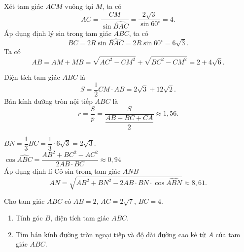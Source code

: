 \begin{bt}
{\begin{center}
\begin{tikzpicture}[line join = round, line cap = round,>=stealth,font=\footnotesize,scale=1]
			\end{tikzpicture}
		\end{center}
		\begin{listEX}[1]
			\item Xét tam giác $ ACM $ vuông tại $ M $, ta có
			\[ AC= \dfrac{CM }{\sin \widehat{BAC}}=\dfrac{2\sqrt{3}}{\sin 60^\circ}=4. \]
			Áp dụng định lý  sin  trong tam giác $ ABC $, ta có
			\[ BC=2R\sin{\widehat{BAC}}=2R\sin 60^\circ=6\sqrt{3}. \]
			Ta có 
			\[ AB=AM+MB=\sqrt{AC^2-CM^2}+\sqrt{BC^2-CM^2}=2+4\sqrt{6}. \]
			\item Diện tích tam giác $ ABC $ là 
			$$ S=\dfrac{1}{2} CM \cdot AB = 2\sqrt{3}+12\sqrt{2} .$$
			Bán kính đường tròn nội tiếp $ ABC $ là 
			\[ r=\dfrac{S}{p}=\dfrac{S}{\dfrac{AB+BC+CA}{2}} \approx 1{,}56. \]
			\item $ BN=\dfrac{1}{3}BC=\dfrac{1}{3}\cdot 6\sqrt{3}=2\sqrt{3}$.\\
			$\cos \widehat{ABC} = \dfrac{AB^2 + BC^2 - AC^2}{2 AB \cdot BC} \approx 0,94 $\\
			Áp dụng định lí Cô-sin trong tam giác $ANB$
			\[ AN = \sqrt{AB^2 + BN^2 - 2AB\cdot BN\cdot\cos \widehat{ABN}} \approx 8,61. \]
		\end{listEX}
	}
\end{bt}

\begin{bt}%
	Cho tam giác $ABC$ có $AB=2$, $AC=2\sqrt{7}$, $BC=4$.
	\begin{enumerate}
		\item Tính góc $B$, diện tích tam giác $ABC$.
		\item Tìm bán kính đường tròn ngoại tiếp và độ dài đường cao kẻ từ $A$ của tam giác $ABC$.
	\end{enumerate}
\end{bt}

